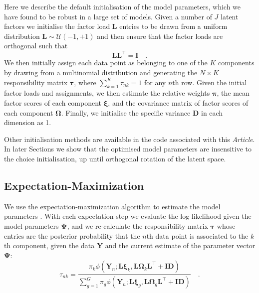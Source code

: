 \documentclass[twocolumn]{aastex61}
\newcommand{\vect}[1]{\boldsymbol{\mathbf{#1}}}
\renewcommand{\vec}[1]{\vect{#1}}
\newcommand{\weight}{\pi}
\newcommand{\data}{\textbf{Y}}
\newcommand{\vecdata}{\vec\data}
\newcommand{\transpose}{^\intercal}
\newcommand{\eye}{\textbf{I}}
\newcommand{\factorloads}{\textbf{L}}
\newcommand{\specificvariance}{\vec{D}}
\newcommand{\scoremeans}{\vec\xi}
\newcommand{\scorecovs}{\vec\Omega}
\newcommand{\NumData}{N}
\newcommand{\numdata}{n}
\newcommand{\NumLatentFactors}{J}
\newcommand{\NumComponents}{K}
\newcommand{\numcomponents}{k}
\begin{document}
Here we describe the default initialisation of the model parameters, which
we have found to be robust in a large set of models. Given a number of
$\NumLatentFactors$ latent factors we initialise the factor load
$\factorloads$ entries to be drawn from a uniform distribution
$\factorloads \sim \mathcal{U}\left(-1, +1\right)$ and then ensure that
the factor loads are orthogonal such that
\begin{equation}
	\factorloads \factorloads\transpose = \eye \quad .
\end{equation}
% 	
We then initially assign each data point as belonging to one of the
$\NumComponents$ components by drawing from a multinomial distribution
and generating the $\NumData \times \NumComponents$ responsibility matrix $\vec\tau$,
where $\sum_{k=1}^{K} \tau_{nk} = 1$ for any $n$th row. Given the initial
factor loads and assignments, we then estimate the relative weights
$\vec\pi$, the mean factor scores of each component $\scoremeans$, and
the covariance matrix of factor scores of each component $\scorecovs$.
Finally, we initialise the specific variance $\specificvariance$ in each
dimension as 1. 

Other initialisation methods are available in the code 
associated with this \emph{Article}. In later Sections we show that 
the optimised model parameters are insensitive to the choice initialisation, 
up until orthogonal rotation of the latent space.


\subsection{Expectation-Maximization}

We use the expectation-maximization algorithm to estimate the model parameters
\citep{Dempster:1977}. With each expectation step we evaluate the log likelihood 
given the model parameters $\vec\Psi$, and we re-calculate the responsibility 
matrix $\vec\tau$ whose entries are the posterior probability that the 
$\numdata$th data point is associated to the $\numcomponents$th component, given 
the data $\vecdata$ and the current estimate of the parameter vector $\vec\Psi$:
\begin{equation}
	\tau_{\numdata\numcomponents} = \frac{\weight_\numcomponents\phi(\vecdata_\numdata;\factorloads\scoremeans_\numcomponents, \factorloads\scorecovs_\numcomponents\factorloads\transpose + \eye\specificvariance)}{\sum_{g=1}^{G}\weight_g\phi(\vecdata_\numdata;\factorloads\scoremeans_g, \factorloads\scorecovs_g\factorloads\transpose + \eye\specificvariance)} \quad .
\end{equation}
\end{document}
